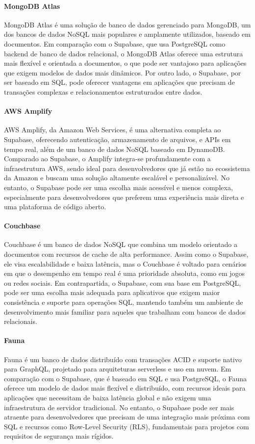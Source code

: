 \paragraph{MongoDB Atlas} MongoDB Atlas é uma solução de banco de dados gerenciado para MongoDB, um dos bancos de dados NoSQL mais populares e amplamente utilizados, baseado em documentos. Em comparação com o Supabase, que usa PostgreSQL como backend de banco de dados relacional, o MongoDB Atlas oferece uma estrutura mais flexível e orientada a documentos, o que pode ser vantajoso para aplicações que exigem modelos de dados mais dinâmicos. Por outro lado, o Supabase, por ser baseado em SQL, pode oferecer vantagens em aplicações que precisam de transações complexas e relacionamentos estruturados entre dados.

\paragraph{AWS Amplify} AWS Amplify, da Amazon Web Services, é uma alternativa completa ao Supabase, oferecendo autenticação, armazenamento de arquivos, e APIs em tempo real, além de um banco de dados NoSQL baseado em DynamoDB. Comparado ao Supabase, o Amplify integra-se profundamente com a infraestrutura AWS, sendo ideal para desenvolvedores que já estão no ecossistema da Amazon e buscam uma solução altamente escalável e personalizável. No entanto, o Supabase pode ser uma escolha mais acessível e menos complexa, especialmente para desenvolvedores que preferem uma experiência mais direta e uma plataforma de código aberto.

\paragraph{Couchbase} Couchbase é um banco de dados NoSQL que combina um modelo orientado a documentos com recursos de cache de alta performance. Assim como o Supabase, ele visa escalabilidade e baixa latência, mas o Couchbase é voltado para cenários em que o desempenho em tempo real é uma prioridade absoluta, como em jogos ou redes sociais. Em contrapartida, o Supabase, com sua base em PostgreSQL, pode ser uma escolha mais adequada para aplicativos que exigem maior consistência e suporte para operações SQL, mantendo também um ambiente de desenvolvimento mais familiar para aqueles que trabalham com bancos de dados relacionais.

\paragraph{Fauna} Fauna é um banco de dados distribuído com transações ACID e suporte nativo para GraphQL, projetado para arquiteturas serverless e uso em nuvem. Em comparação com o Supabase, que é baseado em SQL e usa PostgreSQL, o Fauna oferece um modelo de dados mais flexível e distribuído, com recursos ideais para aplicações que necessitam de baixa latência global e não exigem uma infraestrutura de servidor tradicional. No entanto, o Supabase pode ser mais atraente para desenvolvedores que precisam de uma integração mais próxima com SQL e recursos como Row-Level Security (RLS), fundamentais para projetos com requisitos de segurança mais rígidos.

